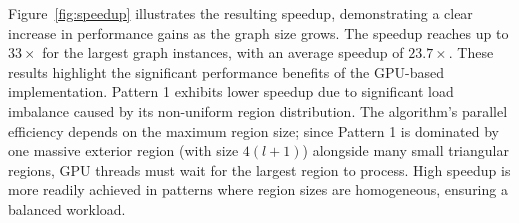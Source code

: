 \documentclass[conference]{IEEEtran}
\begin{document}
Figure~\ref{fig:speedup} illustrates the resulting speedup, demonstrating a clear increase in performance gains as the graph size grows. The speedup reaches up to $33\times$ for the largest graph instances, with an average speedup of $23.7\times$. These results highlight the significant performance benefits of the GPU-based implementation. Pattern 1 exhibits lower speedup due to significant load imbalance caused by its non-uniform region distribution. The algorithm's parallel efficiency depends on the maximum region size; since Pattern 1 is dominated by one massive exterior region (with size $4(l+1)$) alongside many small triangular regions, GPU threads must wait for the largest region to process. High speedup is more readily achieved in patterns where region sizes are homogeneous, ensuring a balanced workload.


\captionsetup[table]{skip=10pt}
\end{document}
